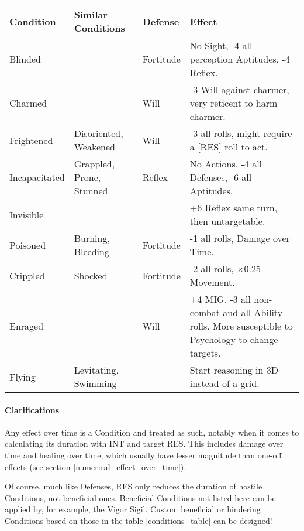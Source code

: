 \begin{table*}[h!tbp]
	\begin{center}
		\begin{tabular}{p{2.5cm}p{3.5cm}p{2cm}p{8cm}} \toprule
			
		    \textbf{Condition} & \textbf{Similar Conditions} & \textbf{Defense} & \textbf{Effect} \\ \midrule

		    Blinded & & Fortitude & No Sight, -4 all perception Aptitudes, -4 Reflex. \\[4mm] 
		    Charmed & & Will & -3 Will against charmer, very reticent to harm charmer. \\[4mm] 
		    Frightened & Disoriented, Weakened & Will & -3 all rolls, might require a [RES] roll to act. \\[4mm] 
            Incapacitated & Grappled, Prone, Stunned & Reflex & No Actions, -4 all Defenses, -6 all Aptitudes. \\[4mm]
			Invisible & & & +6 Reflex same turn, then untargetable. \\[4mm] 
            Poisoned & Burning, Bleeding & Fortitude & -1 all rolls, Damage over Time. \\[4mm] 
            Crippled & Shocked & Fortitude & -2 all rolls, $\times$0.25 Movement. \\[4mm] 
            Enraged & & Will & +4 MIG, -3 all non-combat and all Ability rolls. More susceptible to Psychology to change targets. \\[4mm] 
            Flying & Levitating, Swimming & & Start reasoning in 3D instead of a grid. \\[4mm] 

		    \bottomrule
		\end{tabular}
	\end{center}
	\caption{Conditions}
  \label{conditions_table}
\end{table*}

\paragraph{Clarifications} 

Any effect over time is a Condition and treated as such, notably when it comes to calculating its duration with INT and target RES. This includes damage over time and healing over time, which usually have lesser magnitude than one-off effects (see section \ref{numerical_effect_over_time}).

Of course, much like Defenses, RES only reduces the duration of hostile Conditions, not beneficial ones. Beneficial Conditions not listed here can be applied by, for example, the Vigor Sigil. Custom beneficial or hindering Conditions based on those in the table \ref{conditions_table} can be designed!

